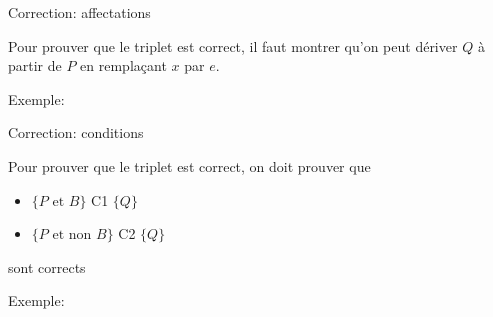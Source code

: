 \begin{frame}{Correction: affectations}

\begin{center}\footnotesize
{}
\end{center}

\bigskip

Pour prouver que le triplet est correct, il faut montrer qu'on peut
dériver $Q$ à partir de $P$ en remplaçant $x$ par $e$.

\bigskip

Exemple:
\begin{center}\footnotesize
{}
\end{center}

\end{frame}

\begin{frame}{Correction: conditions}

\begin{center}\footnotesize
{}
\end{center}

Pour prouver que le triplet est correct, on doit prouver que
\begin{itemize}
\item $\{P\mbox{ et }B\}$ C1 $\{Q\}$
\item $\{P\mbox{ et non }B\}$ C2 $\{Q\}$
\end{itemize}
sont corrects

\bigskip

Exemple: 
\begin{center}\footnotesize
{}
\end{center}

\end{frame}


